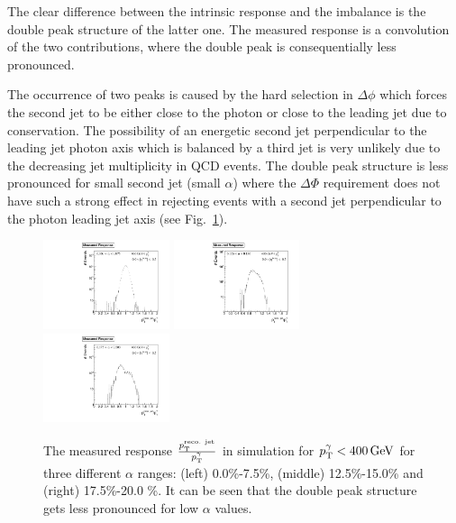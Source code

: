 The clear difference between the intrinsic response and the imbalance is the double peak structure of the latter one. The measured response is a convolution of the two
contributions, where the double peak is consequentially less pronounced.

The occurrence of two peaks is caused by the hard selection in $\Delta \phi$ which forces the second jet to be either close to the photon or close to the leading jet 
due to \pt conservation. 
The possibility of an energetic second jet perpendicular to the leading jet photon axis which is balanced by a third jet is very unlikely 
due to the decreasing jet multiplicity in QCD events.
The double peak structure is less pronounced for small second jet \pt (small $\alpha$) where the $\Delta \Phi$ requirement does not have such a strong effect in rejecting
events with a second jet perpendicular to the photon leading jet axis (see \mbox{Fig. \ref{fig:alphaBins}}).

\begin{figure}[bt]
 \centering
     \includegraphics[width=0.33\textwidth]{figures/resolution/methodology/fullResponseExample1stBin.pdf}
     \includegraphics[width=0.33\textwidth]{figures/resolution/methodology/fullResponseExample4thBin.pdf}
     \includegraphics[width=0.33\textwidth]{figures/resolution/methodology/fullResponseExample6thBin.pdf}
  \caption{The measured response $\frac{p_{\text{T}}^{\text{reco. jet}}}{p_{\text{T}}^{\gamma}}$ in simulation for $p_{\text{T}}^{\gamma} < 400 \,\text{Ge}\kern-0.06667em\text{V}$ for three different $\alpha$ ranges: 
           (left) 0.0\%-7.5\%, (middle) 12.5\%-15.0\% and (right) 17.5\%-20.0 \%. 
           It can be seen that the double peak structure gets less pronounced for low $\alpha$ values.}  
 \label{fig:alphaBins}
\end{figure}

